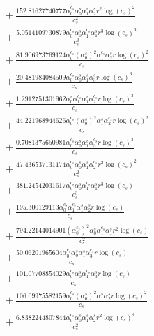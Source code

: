 \documentclass[10pt]{article}
\begin{document}
\begin{align*}
&{}  + \frac{152.81627740777 \alpha_{0}^{c_s} \alpha_{0}^s \alpha_{1}^s \alpha_{2}^s r^{2} \log{\left(c_{s} \right)}^{2}}{c_{s}^{2}} \\
&{}  + \frac{5.0514109730879 \alpha_{0}^{c_s} \alpha_{0}^s \alpha_{1}^{c_s} \alpha_{1}^s r^{3} \log{\left(c_{s} \right)}^{3}}{c_{s}^{3}} \\
&{}  + \frac{81.906973769124 \alpha_{0}^{c_s} \left(\alpha_{0}^s\right)^{2} \alpha_{1}^{c_s} \alpha_{2}^s r \log{\left(c_{s} \right)}^{2}}{c_{s}} \\
&{}  + \frac{20.481984084509 \alpha_{0}^{c_s} \alpha_{0}^s \alpha_{1}^s \alpha_{3}^s r \log{\left(c_{s} \right)}^{3}}{c_{s}} \\
&{}  + \frac{1.2912751301962 \alpha_{0}^s \alpha_{1}^{c_s} \alpha_{1}^s \alpha_{2}^{c_s} r \log{\left(c_{s} \right)}^{3}}{c_{s}} \\
&{}  + \frac{44.221968944626 \alpha_{0}^{c_s} \left(\alpha_{0}^s\right)^{2} \alpha_{1}^s \alpha_{2}^{c_s} r \log{\left(c_{s} \right)}^{2}}{c_{s}} \\
&{}  + \frac{0.7081375650981 \alpha_{0}^{c_s} \alpha_{0}^s \alpha_{1}^s \alpha_{3}^{c_s} r \log{\left(c_{s} \right)}^{3}}{c_{s}} \\
&{}  + \frac{47.436537131174 \alpha_{0}^{c_s} \alpha_{0}^s \alpha_{1}^s \alpha_{2}^{c_s} r^{2} \log{\left(c_{s} \right)}^{2}}{c_{s}^{2}} \\
&{}  + \frac{381.24542031617 \alpha_{0}^{c_s} \alpha_{0}^s \alpha_{1}^{c_s} \alpha_{1}^s r^{3} \log{\left(c_{s} \right)}}{c_{s}^{3}} \\
&{}  + \frac{195.300129113 \alpha_{0}^{c_s} \alpha_{1}^{c_s} \alpha_{1}^s \alpha_{2}^s r \log{\left(c_{s} \right)}}{c_{s}} \\
&{}  + \frac{794.22144014901 \left(\alpha_{0}^{c_s}\right)^{2} \alpha_{0}^s \alpha_{1}^{c_s} \alpha_{1}^s r^{2} \log{\left(c_{s} \right)}}{c_{s}^{2}} \\
&{}  + \frac{50.06201965604 \alpha_{0}^{c_s} \alpha_{0}^s \alpha_{1}^s \alpha_{3}^{c_s} r \log{\left(c_{s} \right)}}{c_{s}} \\
&{}  + \frac{101.07708854029 \alpha_{0}^{c_s} \alpha_{0}^s \alpha_{1}^{c_s} \alpha_{3}^s r \log{\left(c_{s} \right)}}{c_{s}} \\
&{}  + \frac{106.09975582159 \alpha_{0}^{c_s} \left(\alpha_{0}^s\right)^{2} \alpha_{1}^s \alpha_{2}^s r \log{\left(c_{s} \right)}^{2}}{c_{s}} \\
&{}  + \frac{6.8382244807844 \alpha_{0}^{c_s} \alpha_{0}^s \alpha_{1}^s \alpha_{2}^s r^{2} \log{\left(c_{s} \right)}^{4}}{c_{s}^{2}} \\

\end{align*}
\end{document}
